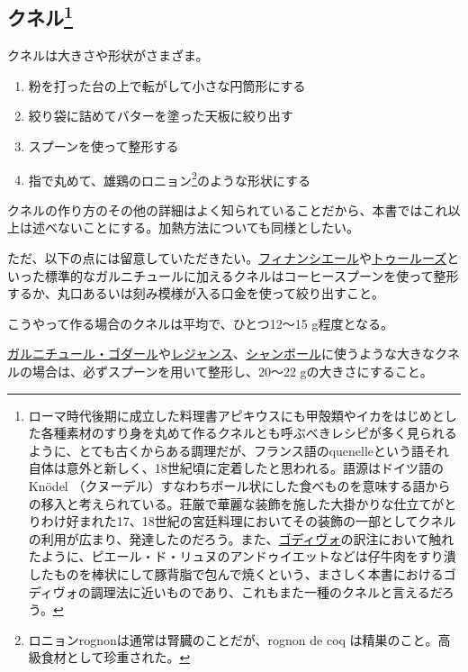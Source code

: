 \hypertarget{ux30afux30cdux30eb54}{%
\subsection[クネル]{\texorpdfstring{クネル\footnote{ローマ時代後期に成立した料理書アピキウスにも甲殻類やイカをはじめとした各種素材のすり身を丸めて作るクネルとも呼ぶべきレシピが多く見られるように、とても古くからある調理だが、フランス語のquenelleという語それ自体は意外と新しく、18世紀頃に定着したと思われる。語源はドイツ語の
  Knödel
  （クヌーデル）すなわちボール状にした食べものを意味する語からの移入と考えられている。荘厳で華麗な装飾を施した大掛かりな仕立てがとりわけ好まれた17、18世紀の宮廷料理においてその装飾の一部としてクネルの利用が広まり、発達したのだろう。また、\protect\hyperlink{godiveau}{ゴディヴォ}の訳注において触れたように、ピエール・ド・リュヌのアンドゥイエットなどは仔牛肉をすり潰したものを棒状にして豚背脂で包んで焼くという、まさしく本書におけるゴディヴォの調理法に近いものであり、これもまた一種のクネルと言えるだろう。}}{クネル}}\label{ux30afux30cdux30eb54}}


クネルは大きさや形状がさまざま。

\begin{enumerate}
\def\labelenumi{\arabic{enumi}.}
\item
  粉を打った台の上で転がして小さな円筒形にする
\item
  絞り袋に詰めてバターを塗った天板に絞り出す
\item
  スプーンを使って整形する
\item
  指で丸めて、雄鶏のロニョン\footnote{ロニョンrognonは通常は腎臓のことだが、rognon
    de coq は精巣のこと。高級食材として珍重された。}のような形状にする
\end{enumerate}

クネルの作り方のその他の詳細はよく知られていることだから、本書ではこれ以上は述べないことにする。加熱方法についても同様としたい。

ただ、以下の点には留意していただきたい。\protect\hyperlink{garniture-a-la-financiere}{フィナンシエール}や\protect\hyperlink{garniture-toulouse}{トゥールーズ}といった標準的なガルニチュールに加えるクネルはコーヒースプーンを使って整形するか、丸口あるいは刻み模様が入る口金を使って絞り出すこと。

こうやって作る場合のクネルは平均で、ひとつ12〜15 g程度となる。

\protect\hyperlink{garniture-godard}{ガルニチュール・ゴダール}や\protect\hyperlink{garniture-regence}{レジャンス}、\protect\hyperlink{garniture-chambole}{シャンボール}に使うような大きなクネルの場合は、必ずスプーンを用いて整形し、20〜22
gの大きさにすること。


